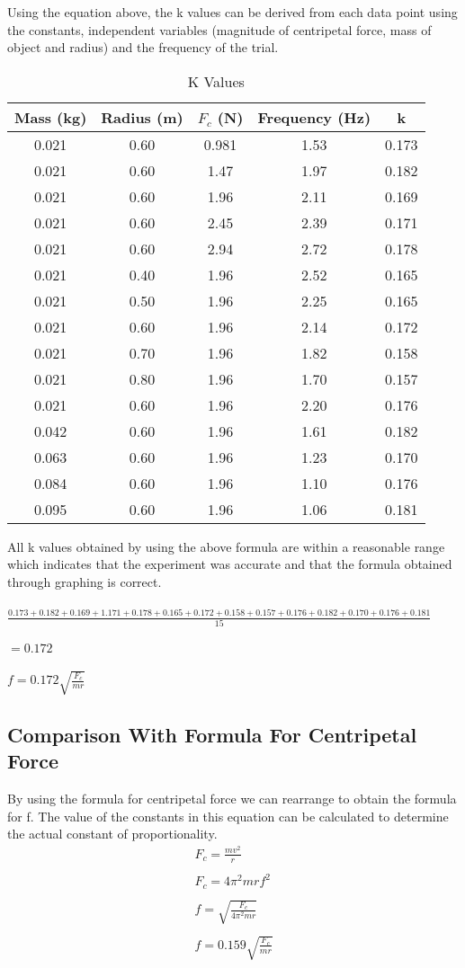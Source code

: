 \documentclass{article}[12pt]
\begin{document}
Using the equation above, the k values can be derived from each data point using the constants, independent variables (magnitude of centripetal force, mass of object and radius) and the frequency of the trial.

\begin{table}[H]
\centering
\caption*{K Values}
\begin{tabular}{c c c c c}

\hline\hline
Mass (kg)&Radius (m)& $F_c$ (N)&Frequency (Hz)&k \\ [0.5ex] 
\hline
0.021&0.60&0.981&1.53&0.173\\
0.021&0.60&1.47&1.97&0.182\\
0.021&0.60&1.96&2.11&0.169\\
0.021&0.60&2.45&2.39&0.171\\
0.021&0.60&2.94&2.72&0.178\\
0.021&0.40&1.96&2.52&0.165\\
0.021&0.50&1.96&2.25&0.165\\
0.021&0.60&1.96&2.14&0.172\\
0.021&0.70&1.96&1.82&0.158\\
0.021&0.80&1.96&1.70&0.157\\
0.021&0.60&1.96&2.20&0.176\\
0.042&0.60&1.96&1.61&0.182\\
0.063&0.60&1.96&1.23&0.170\\
0.084&0.60&1.96&1.10&0.176\\
0.095&0.60&1.96&1.06&0.181\\[1ex]
\hline
\end{tabular}
\label{table:massChange}
\end{table}
All k values obtained by using the above formula are within a reasonable range which indicates that the experiment was accurate and that the formula obtained through graphing is correct.\\\\
$\frac{0.173+0.182+0.169+1.171+0.178+0.165+0.172+0.158+0.157+0.176+0.182+0.170+0.176+0.181}{15}$\\
\\$= 0.172 $\\\\
$f=0.172\sqrt{\frac{F_c}{mr}}$
\subsection{Comparison With Formula For Centripetal Force}
By using the formula for centripetal force we can rearrange to obtain the formula for f. The value of the constants in this equation can be calculated to determine the actual constant of proportionality.
\begin{eqnarray*}
  F_c=\frac{mv^2}{r} \\\\
  F_c=4\pi^2mrf^2\\\\
  f=\sqrt{\frac{F_c}{4\pi^2mr}}\\\\
  f=0.159\sqrt{\frac{F_c}{mr}}\\\\
\end{eqnarray*}
\end{document}
